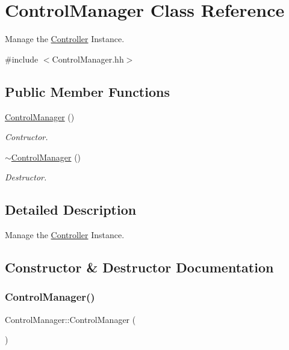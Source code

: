 \hypertarget{classControlManager}{}\section{Control\+Manager Class Reference}
\label{classControlManager}


Manage the \hyperlink{classController}{Controller} Instance.  




{\ttfamily \#include $<$Control\+Manager.\+hh$>$}

\subsection*{Public Member Functions}
\begin{DoxyCompactItemize}
\item 
\hyperlink{classControlManager_ac47df3d59d665fa9e6201677689ddf6a}{Control\+Manager} ()
\begin{DoxyCompactList}\small\item\em Contructor. \end{DoxyCompactList}\item 
\hyperlink{classControlManager_a58c547d9cb07dfaa0d6967cc656b80cb}{$\sim$\+Control\+Manager} ()
\begin{DoxyCompactList}\small\item\em Destructor. \end{DoxyCompactList}\end{DoxyCompactItemize}


\subsection{Detailed Description}
Manage the \hyperlink{classController}{Controller} Instance. 

\subsection{Constructor \& Destructor Documentation}
\mbox{\label{classControlManager_ac47df3d59d665fa9e6201677689ddf6a}} 
\subsubsection{\texorpdfstring{Control\+Manager()}{ControlManager()}}
{\footnotesize\ttfamily Control\+Manager\+::\+Control\+Manager (\begin{DoxyParamCaption}{ }\end{DoxyParamCaption})}



